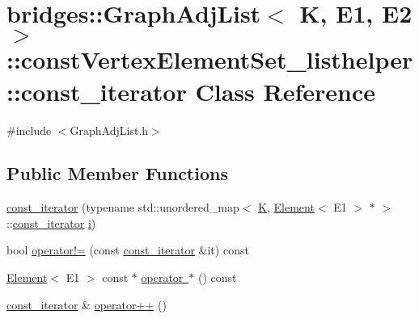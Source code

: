 \hypertarget{classbridges_1_1_graph_adj_list_1_1const_vertex_element_set__listhelper_1_1const__iterator}{}\section{bridges\+::Graph\+Adj\+List$<$ K, E1, E2 $>$\+::const\+Vertex\+Element\+Set\+\_\+listhelper\+::const\+\_\+iterator Class Reference}
\label{classbridges_1_1_graph_adj_list_1_1const_vertex_element_set__listhelper_1_1const__iterator}


{\ttfamily \#include $<$Graph\+Adj\+List.\+h$>$}

\subsection*{Public Member Functions}
\begin{DoxyCompactItemize}
\item 
\mbox{\hyperlink{classbridges_1_1_graph_adj_list_1_1const_vertex_element_set__listhelper_1_1const__iterator_a5b0e97db3f9ce1a92600ab27634dfb25}{const\+\_\+iterator}} (typename std\+::unordered\+\_\+map$<$ \mbox{\hyperlink{namespacebridges_acfb0a4f7877d8f63de3e6862004c50edaa5f3c6a11b03839d46af9fb43c97c188}{K}}, \mbox{\hyperlink{classbridges_1_1_element}{Element}}$<$ E1 $>$ $\ast$ $>$\+::\mbox{\hyperlink{classbridges_1_1_graph_adj_list_1_1const_vertex_element_set__listhelper_1_1const__iterator}{const\+\_\+iterator}} \mbox{\hyperlink{namespacebridges_acfb0a4f7877d8f63de3e6862004c50eda865c0c0b4ab0e063e5caa3387c1a8741}{i}})
\item 
bool \mbox{\hyperlink{classbridges_1_1_graph_adj_list_1_1const_vertex_element_set__listhelper_1_1const__iterator_abf8be34e9256e09beb06980163182cc0}{operator!=}} (const \mbox{\hyperlink{classbridges_1_1_graph_adj_list_1_1const_vertex_element_set__listhelper_1_1const__iterator}{const\+\_\+iterator}} \&it) const
\item 
\mbox{\hyperlink{classbridges_1_1_element}{Element}}$<$ E1 $>$ const  $\ast$ \mbox{\hyperlink{classbridges_1_1_graph_adj_list_1_1const_vertex_element_set__listhelper_1_1const__iterator_a37b482199154ad3e516a629059730108}{operator $\ast$}} () const
\item 
\mbox{\hyperlink{classbridges_1_1_graph_adj_list_1_1const_vertex_element_set__listhelper_1_1const__iterator}{const\+\_\+iterator}} \& \mbox{\hyperlink{classbridges_1_1_graph_adj_list_1_1const_vertex_element_set__listhelper_1_1const__iterator_a3c654115a3c563a3a8b3b4613bddd763}{operator++}} ()
\end{DoxyCompactItemize}


